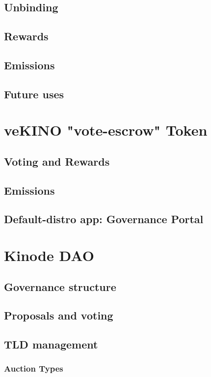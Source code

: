 \documentclass[runningheads]{llncs}
\begin{document}
\subsection{Unbinding}
\subsection{Rewards}
\subsection{Emissions}
\subsection{Future uses}



\section{veKINO "vote-escrow" Token}
\subsection{Voting and Rewards}
\subsection{Emissions}
\subsection{Default-distro app: Governance Portal}



\section{Kinode DAO}
\subsection{Governance structure}
\subsection{Proposals and voting}
\subsection{TLD management}
\subsubsection{Auction Types}
\end{document}
